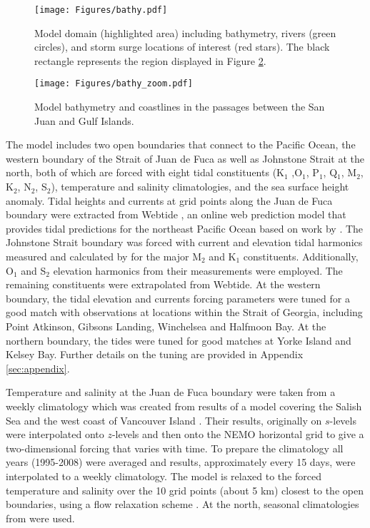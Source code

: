 \documentclass[letterpaper]{tATO2e}
\begin{document}
\begin{figure}[h]
\centering
\texttt{[image: Figures/bathy.pdf]}
\caption{{\color{red} Model domain (highlighted area) including bathymetry, rivers (green circles), and storm surge locations of interest  (red stars). The black rectangle represents the region displayed in Figure \ref{fig:zoom}.}}\label{fig:domain}
\end{figure}

\begin{figure}[h]
\centering
\texttt{[image: Figures/bathy\_zoom.pdf]}
\caption{{\color{red} Model bathymetry and coastlines in the passages between the San Juan and Gulf Islands.}}\label{fig:zoom}
\end{figure}

The model includes two open boundaries that connect to the Pacific Ocean, the western boundary of the Strait of Juan de Fuca as well as Johnstone Strait at the north, both of which are forced with eight tidal constituents (K$_1$ ,O$_1$, P$_1$, Q$_1$, M$_2$, K$_2$, N$_2$, S$_2$), temperature and salinity climatologies, and the sea surface height anomaly. Tidal heights and currents at grid points along the Juan de Fuca boundary were extracted from Webtide \citep{webtide}, an online web prediction model that provides tidal predictions for the northeast Pacific Ocean based on work by \citet{foreman2000webtide}. The Johnstone Strait boundary was forced with current and elevation tidal harmonics measured and calculated by \citet{thomson1980johnstone} for the major M$_2$ and K$_1$ constituents. Additionally, O$_1$ and S$_2$ elevation harmonics from their measurements were employed. The remaining constituents were extrapolated from Webtide. At the western boundary, the tidal elevation and currents forcing parameters were tuned for a good match with observations at locations within the Strait of Georgia, including Point Atkinson, Gibsons Landing, Winchelsea and Halfmoon Bay. At the northern boundary, the tides were tuned for good matches at Yorke Island and Kelsey Bay. Further details on the tuning are provided in Appendix \ref{sec:appendix}. 

Temperature and salinity at the Juan de Fuca boundary were taken from a weekly climatology which was created from results of a model covering the Salish Sea and the west coast of Vancouver Island \citep{massonfine2012}.  Their results, originally on $s$-levels were interpolated onto $z$-levels and then onto the NEMO horizontal grid to give a two-dimensional forcing that varies with time.  To prepare the climatology all years (1995-2008) were averaged and results, approximately every 15 days, were interpolated to a weekly climatology. The model is relaxed to the forced temperature and salinity over the 10 grid points (about 5 km) closest to the open boundaries, using a flow relaxation scheme \citep{engedahl1995use}. {\color{red} At the north, seasonal climatologies from \citet{thomson1981oceanography} were used.} %
\end{document}
